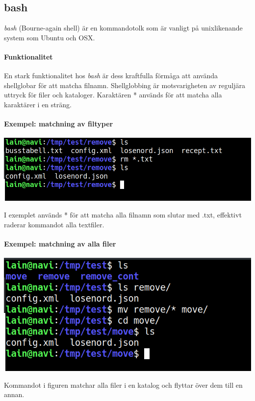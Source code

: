 \subsection{bash}
\emph{bash} (Bourne-again shell) är en kommandotolk som är vanligt på unixlikenande system som Ubuntu och OSX. 
\paragraph{Funktionalitet}
En stark funktionalitet hos \emph{bash} är dess kraftfulla förmåga att använda shellglobar för att matcha filnamn.
Shellglobbing är motsvarigheten av reguljära uttryck för filer och kataloger. Karaktären * används för att matcha alla karaktärer i en sträng.
\paragraph{Exempel: matchning av filtyper}
\begin{center}
        \includegraphics[width=\linewidth]{bilder/bash_remove_filetype.png}
\end{center}
I exemplet används * för att matcha alla filnamn som slutar med .txt, effektivt raderar kommandot alla textfiler.
\paragraph{Exempel: matchning av alla filer}
\begin{center}
        \includegraphics[width=\linewidth]{bilder/bash_move_files.png}
\end{center}
Kommandot i figuren matchar alla filer i en katalog och flyttar över dem till en annan.
